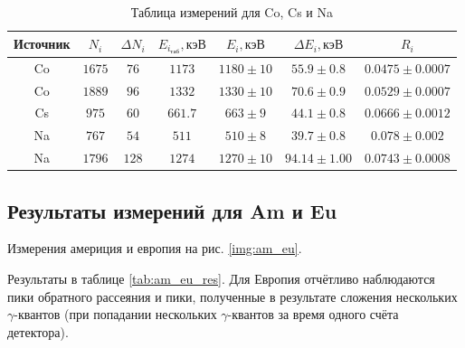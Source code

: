 \documentclass[a4paper, 12pt]{article}
\begin{document}
            \begin{table}[!ht]
                \centering
                \begin{tabular}{|c|c|c|c|c|c|c|}
                    \hline

                    Источник & $N_i$ & $\Delta N_i$ & $E_{i_{таб}}, кэВ$ & $E_i, кэВ$ & $\Delta E_i, кэВ$ & $R_i$\\ \hline
                    Co & $1675$ & $76$ & $1173$ & $1180 \pm 10$ & $55.9 \pm 0.8$ & $0.0475 \pm 0.0007$\\ \hline
                    Co & $1889$ & $96$ & $1332$ & $1330 \pm 10$ & $70.6 \pm 0.9$ & $0.0529 \pm 0.0007$\\ \hline
                    Cs & $975$ & $60$ & $661.7$ & $663 \pm 9$ & $44.1 \pm 0.8$ & $0.0666 \pm 0.0012$\\ \hline
                    Na & $767$ & $54$ & $511$ & $510 \pm 8$ & $39.7 \pm 0.8$ & $0.078 \pm 0.002$\\ \hline
                    Na & $1796$ & $128$ & $1274$ & $1270 \pm 10$ & $94.14 \pm 1.00$ & $0.0743 \pm 0.0008$\\ \hline

                \end{tabular}
                \caption{Таблица измерений для Co, Cs и Na}
                \label{tab:cal_res}
            \end{table}

        \subsection{Результаты измерений для Am и Eu}

            Измерения америция и европия на рис. \ref{img:am_eu}.

            Результаты в таблице \ref{tab:am_eu_res}. Для Европия отчётливо наблюдаются пики обратного рассеяния и пики, полученные в результате сложения нескольких $\gamma$-квантов (при попадании нескольких $\gamma$-квантов за время одного счёта детектора).
\end{document}
